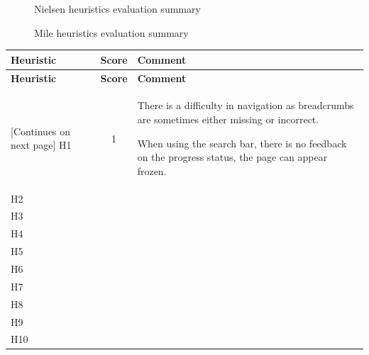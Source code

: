 \begin{figure}[!ht]
    \begin{minipage}{\linewidth}
        \centering
        \captionsetup{justification=centering}
        \caption{Nielsen heuristics evaluation summary}
        \label{BarsNielsenCrop}
    \end{minipage}
\end{figure}

\begin{figure}[!ht]
    \begin{minipage}{\linewidth}
        \centering
        \captionsetup{justification=centering}
        \caption{Mile heuristics evaluation summary}
        \label{BarsMileCrop}
    \end{minipage}
\end{figure}

\begin{tabularx}{\linewidth}{l c X}
\toprule
\textbf{Heuristic} & \textbf{Score} & \textbf{Comment} \\
\midrule
\endfirsthead
\toprule
\textbf{Heuristic} & \textbf{Score} & \textbf{Comment} \\
\midrule
\endhead
\midrule
\footnotesize [Continues on next page]
\endfoot
\bottomrule
\endlastfoot
    H1 & 1 & There is a difficulty in navigation as breadcrumbs are sometimes either missing or incorrect.\par When using the search bar, there is no feedback on the progress status, the page can appear frozen. \\ \midrule
    H2 &  & \\ \midrule
    H3 &  & \\ \midrule
    H4 &  & \\ \midrule
    H5 &  & \\ \midrule
    H6 &  & \\ \midrule
    H7 &  & \\ \midrule
    H8 &  & \\ \midrule
    H9 &  & \\ \midrule
    H10 &  &
\end{tabularx}

